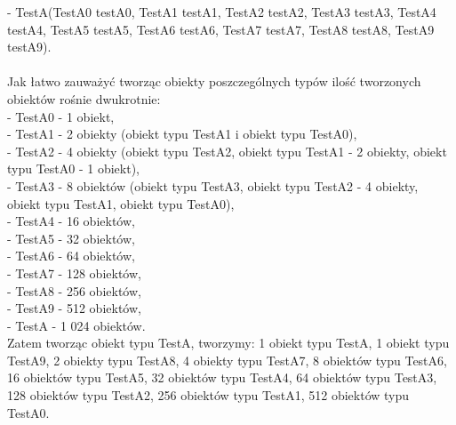 \documentclass[12pt]{article}
\begin{document}
- TestA(TestA0 testA0, TestA1 testA1, TestA2 testA2, TestA3 testA3, TestA4 testA4, TestA5 testA5, TestA6 testA6, TestA7 testA7, TestA8 testA8, TestA9 testA9).\\
\\
Jak łatwo zauważyć tworząc obiekty poszczególnych typów ilość tworzonych obiektów rośnie dwukrotnie:\\
- TestA0 - 1 obiekt,\\
- TestA1 - 2 obiekty (obiekt typu TestA1 i obiekt typu TestA0),\\
- TestA2 - 4 obiekty (obiekt typu TestA2, obiekt typu TestA1 - 2 obiekty, obiekt typu TestA0 - 1 obiekt),\\
- TestA3 - 8 obiektów (obiekt typu TestA3, obiekt typu TestA2 - 4 obiekty, obiekt typu TestA1, obiekt typu TestA0),\\
- TestA4 - 16 obiektów,\\
- TestA5 - 32 obiektów,\\
- TestA6 - 64 obiektów,\\
- TestA7 - 128 obiektów,\\
- TestA8 - 256 obiektów,\\
- TestA9 - 512 obiektów,\\
- TestA - 1 024 obiektów.\\
Zatem tworząc obiekt typu TestA, tworzymy: 1 obiekt typu TestA, 1 obiekt typu TestA9, 2 obiekty typu TestA8, 4 obiekty typu TestA7, 8 obiektów typu TestA6, 16 obiektów typu TestA5, 32 obiektów typu TestA4, 64 obiektów typu TestA3, 128 obiektów typu TestA2, 256 obiektów typu TestA1, 512 obiektów typu TestA0.
\end{document}
